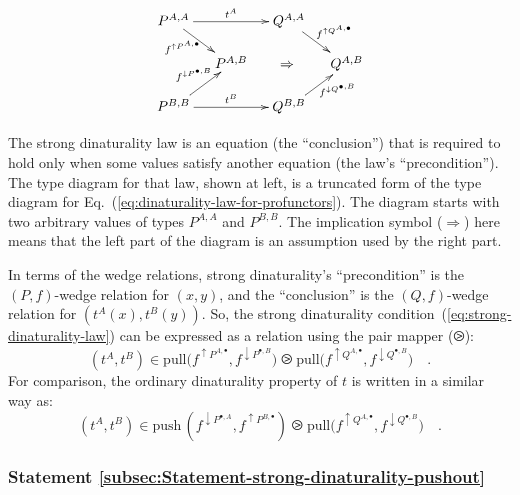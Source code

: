 \begin{wrapfigure}{i}{0.32\columnwidth}%
\vspace{-2.5\baselineskip}
\[
\xymatrix{\xyScaleY{1.2pc}\xyScaleX{1.0pc}P^{A,A}\ar[rd]\sb(0.35){f^{\uparrow P^{A,\bullet}}\negthickspace\negthickspace}\ar[rr]\sp(0.5){t^{A}} &  & Q^{A,A}\ar[rd]\sp(0.5){f^{\uparrow Q^{A,\bullet}}}\\
 & P^{A,B} & \negthickspace\Rightarrow & Q^{A,B}\\
P^{B,B}\ar[ru]\sp(0.5){f^{\downarrow P^{\bullet,B}}\negthickspace\negthickspace\negthickspace}\ar[rr]\sp(0.5){t^{B}} &  & Q^{B,B}\ar[ru]\sb(0.65){\negthickspace\negthickspace f^{\downarrow Q^{\bullet,B}}}
}
\]
\vspace{-2\baselineskip}
\end{wrapfigure}%

\noindent The strong dinaturality law is an equation (the \textsf{``}conclusion\textsf{''})
that is required to hold only when some values satisfy another equation
(the law\textsf{'}s \textsf{``}precondition\textsf{''}). The type diagram for that law, shown
at left, is a truncated form of the type diagram for Eq.~(\ref{eq:dinaturality-law-for-profunctors}).
The diagram starts with two arbitrary values of types $P^{A,A}$ and
$P^{B,B}$. The implication symbol ($\Rightarrow$) here means that
the left part of the diagram is an assumption used by the right part.

In terms of the wedge relations, strong dinaturality\textsf{'}s \textsf{``}precondition\textsf{''}
is the $\left(P,f\right)$-wedge relation for $(x,y)$, and the \textsf{``}conclusion\textsf{''}
is the $\left(Q,f\right)$-wedge relation for $(t^{A}(x),t^{B}(y))$.
So, the strong dinaturality condition~(\ref{eq:strong-dinaturality-law})
can be expressed as a relation using the pair mapper ($\ogreaterthan$):
\[
(t^{A},t^{B})\in\text{pull}\big(f^{\uparrow P^{A,\bullet}},f^{\downarrow P^{\bullet,B}}\big)\ogreaterthan\text{pull}\big(f^{\uparrow Q^{A,\bullet}},f^{\downarrow Q^{\bullet,B}}\big)\quad.
\]
For comparison, the ordinary dinaturality property of $t$ is written
in a similar way as:
\[
(t^{A},t^{B})\in\text{push}\,(f^{\downarrow P^{\bullet,A}},f^{\uparrow P^{B,\bullet}})\ogreaterthan\text{pull}\big(f^{\uparrow Q^{A,\bullet}},f^{\downarrow Q^{\bullet,B}}\big)\quad.
\]


\subsubsection{Statement \label{subsec:Statement-strong-dinaturality-pushout}\ref{subsec:Statement-strong-dinaturality-pushout}}


